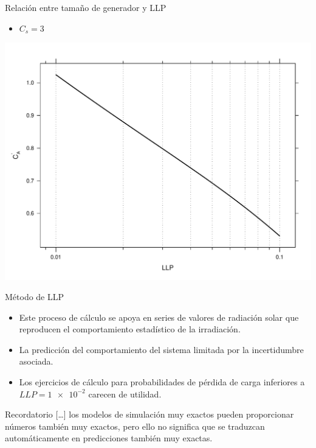 \documentclass[xcolor={usenames,svgnames,dvipsnames}]{beamer}
\begin{document}
\begin{frame}[label={sec:orgf3c6b1d}]{Relación entre tamaño de generador y LLP}
\begin{itemize}
\item \(C_{s}=3\)
\end{itemize}

\begin{center}
\includegraphics[width=.9\linewidth]{../figs/CurvasLLP_Cs3.pdf}
\end{center}
\end{frame}

\begin{frame}[label={sec:orgaebd85e}]{Método de LLP}
\begin{itemize}
\item Este proceso de cálculo se apoya en series de valores de radiación
solar que reproducen el comportamiento estadístico de la
irradiación.

\item La predicción del comportamiento del sistema limitada por la
incertidumbre asociada.

\item Los ejercicios de cálculo para probabilidades de pérdida de carga
inferiores a \(LLP=\num{1e-2}\) carecen de utilidad.
\end{itemize}

\begin{block}{Recordatorio}
\guillemotleft{}[\ldots{}] los modelos de simulación muy exactos pueden proporcionar números también muy exactos, pero ello no significa que se traduzcan automáticamente en predicciones también muy exactas.\guillemotright{}
\end{block}
\end{frame}
\end{document}
